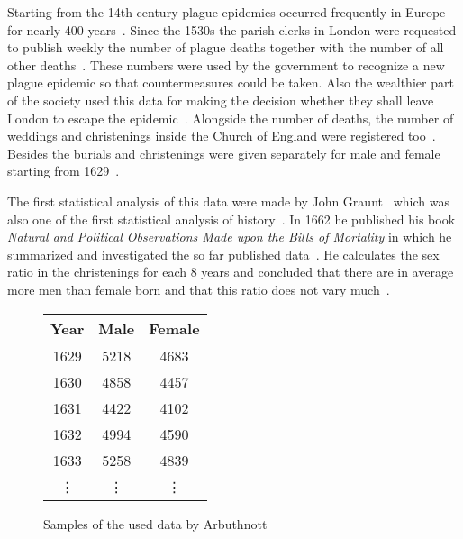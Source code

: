 Starting from the 14th century plague epidemics occurred frequently in Europe for nearly 400 years~\cite[p. 82]{hald1}. Since the 1530s the parish clerks in London were requested to publish weekly the number of plague deaths together with the number of all other deaths~\cite[p. 82]{hald1}. These numbers were used by the government to recognize a new plague epidemic so that countermeasures could be taken. Also the wealthier part of the society used this data for making the decision whether they shall leave London to escape the epidemic~\cite[pp. 82-83]{hald1}. Alongside the number of deaths, the number of weddings and christenings inside the Church of England were registered too~\cite[p. 83]{hald1}. Besides the burials and christenings were given separately for male and female starting from 1629~\cite[p. 83]{hald1}.

The first statistical analysis of this data were made by John Graunt~\cite[p. 83]{hald1} which was also one of the first statistical analysis of history~\cite[p. 81]{hald1}. In 1662 he published his book \emph{Natural and Political Observations Made upon the Bills of Mortality} in which he summarized and investigated the so far published data~\cite[pp. 81-105]{hald1}. He calculates the sex ratio in the christenings for each 8 years and concluded that there are in average more men than female born and that this ratio does not vary much~\cite[pp. 92-93]{hald1}.

\begin{figure}
  \begin{center}
    \begin{tabular}{c|c|c}
      Year & Male & Female \\
      \hline
      1629 & 5218 & 4683 \\
      1630 & 4858 & 4457 \\
      1631 & 4422 & 4102 \\
      1632 & 4994 & 4590 \\
      1633 & 5258 & 4839 \\
      \vdots & \vdots & \vdots
    \end{tabular}

    \caption{Samples of the used data by Arbuthnott~\cite[p. 276]{hald1}}
  \end{center}
\end{figure}

